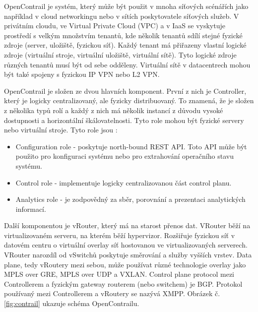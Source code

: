 OpenContrail je systém, který může být použit v mnoha síťových scénářích jako například v cloud networkingu nebo v sítích poskytovatele síťových služeb. V privátním cloudu, ve Virtual Private Cloud (VPC) a v IaaS se vyskytuje prostředí s velkým množstvím tenantů, kde několik tenantů sdílí stejné fyzické zdroje (server, uložiště, fyzickou síť). Každý tenant má přiřazeny vlastní logické zdroje (virtuální stroje, virtuální uložiště, virtuální sítě). Tyto logické zdroje různých tenantů musí být od sebe odděleny. Virtuální sítě v datacentrech mohou být také spojeny s fyzickou IP VPN nebo L2 VPN. \cite{OpenContrail}

OpenContrail je složen ze dvou hlavních komponent. První z nich je Controller, který je logicky centralizovaný, ale fyzicky distribuovaný. To znamená, že je složen z několika typů rolí a každý z nich má několik instancí z důvodu vysoké dostupnosti a horizontální škálovatelnosti. Tyto role mohou být fyzické servery nebo virtuální stroje. Tyto role jsou \cite{OpenContrail2}: 

\begin{itemize}
\item Configuration role - poskytuje north-bound REST API. Toto API může být použito pro konfiguraci systému nebo pro extrahování operačního stavu systému.
\item Control role - implementuje logicky centralizovanou část control planu.
\item Analytics role - je zodpovědný za sběr, porovnání a prezentaci analytických informací.
\end{itemize}

Další komponentou je vRouter, který má na starost přenos dat. VRouter běží na virtualizovaném serveru, na kterém běží hypervizor. Rozšiřuje fyzickou síť v datovém centru o virtuální overlay síť hostovanou ve virtualizovaných serverech. VRouter narozdíl od vSwitchů poskytuje směrování a služby vyšších vrstev. Data plane, tedy vRoutery mezi sebou, může používat různé technologie overlay jako MPLS over GRE, MPLS over UDP a VXLAN. Control plane protocol mezi Controllerem a fyzickým gateway routerem (nebo switchem) je BGP. Protokol používaný mezi Controllerem a vRoutery se nazývá XMPP. Obrázek č. \ref{fig:contrail} ukazuje schéma OpenContrailu.

